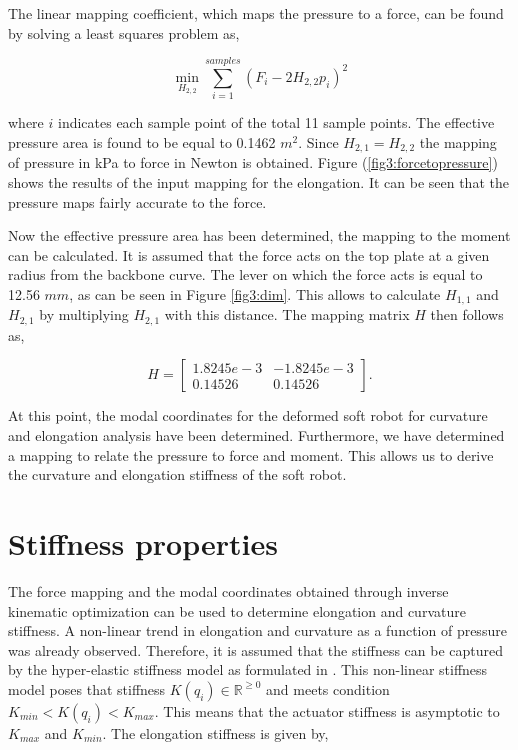 The linear mapping coefficient, which maps the pressure to a force, can be found by solving a least squares problem as,

\begin{equation}
\min_{H_{2,2}} \sum_{i=1}^{samples} (F_i - 2 H_{2,2} p_i)^2
\label{eq3:forcefitting}
\end{equation}

where $i$ indicates each sample point of the total 11 sample points. The effective pressure area is found to be equal to 0.1462 $m^2$. Since $H_{2,1} = H_{2,2}$ the mapping of pressure in kPa to force in Newton is obtained. Figure (\ref{fig3:forcetopressure}) shows the results of the input mapping for the elongation. It can be seen that the pressure maps fairly accurate to the force.

Now the effective pressure area has been determined, the mapping to the moment can be calculated. It is assumed that the force acts on the top plate at a given radius from the backbone curve. The lever on which the force acts is equal to 12.56 $mm$, as can be seen in Figure \ref{fig3:dim}. This allows to calculate $H_{1,1}$ and $H_{2,1}$ by multiplying $H_{2,1}$ with this distance. The mapping matrix $H$ then follows as,

\begin{equation}
    H =  \begin{bmatrix} 1.8245e-3 & -1.8245e-3 \\
    0.14526 & 0.14526\end{bmatrix}.  
\end{equation}

At this point, the modal coordinates for the deformed soft robot for curvature and elongation analysis have been determined. Furthermore, we have determined a mapping to relate the pressure to force and moment. This allows us to derive the curvature and elongation stiffness of the soft robot. 




\section{Stiffness properties}

The force mapping and the modal coordinates obtained through inverse kinematic optimization can be used to determine elongation and curvature stiffness. A non-linear trend in elongation and curvature as a function of pressure was already observed. Therefore, it is assumed that the stiffness can be captured by the hyper-elastic stiffness model as formulated in \cite{Caasenbrood2020StiffnessModel}. This non-linear stiffness model poses that stiffness $K(q_i) \in \mathbb{R}^{\geq 0}$ and meets condition $K_{min} < K(q_i) < K_{max}$. This means that the actuator stiffness is asymptotic to $K_{max}$ and $K_{min}$.  The elongation stiffness is given by,

